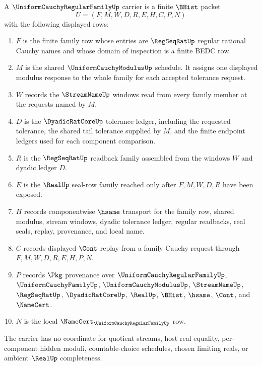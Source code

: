 \begin{definition}
\label{def:uniform-cauchy-regular-family-carrier}
A $\UniformCauchyRegularFamilyUp$ carrier is a finite $\BHist$ packet
$$
U=(F,M,W,D,R,E,H,C,P,N)
$$
with the following displayed rows:
\begin{enumerate}
\item $F$ is the finite family row whose entries are $\RegSeqRatUp$ regular rational Cauchy names and whose domain of inspection is a finite BEDC row.
\item $M$ is the shared $\UniformCauchyModulusUp$ schedule. It assigns one displayed modulus response to the whole family for each accepted tolerance request.
\item $W$ records the $\StreamNameUp$ windows read from every family member at the requests named by $M$.
\item $D$ is the $\DyadicRatCoreUp$ tolerance ledger, including the requested tolerance, the shared tail tolerance supplied by $M$, and the finite endpoint ledgers used for each component comparison.
\item $R$ is the $\RegSeqRatUp$ readback family assembled from the windows $W$ and dyadic ledger $D$.
\item $E$ is the $\RealUp$ seal-row family reached only after $F,M,W,D,R$ have been exposed.
\item $H$ records componentwise $\hsame$ transport for the family row, shared modulus, stream windows, dyadic tolerance ledger, regular readbacks, real seals, replay, provenance, and local name.
\item $C$ records displayed $\Cont$ replay from a family Cauchy request through $F,M,W,D,R,E,H,P,N$.
\item $P$ records $\Pkg$ provenance over $\UniformCauchyRegularFamilyUp$, $\UniformCauchyFamilyUp$, $\UniformCauchyModulusUp$, $\StreamNameUp$, $\RegSeqRatUp$, $\DyadicRatCoreUp$, $\RealUp$, $\BHist$, $\hsame$, $\Cont$, and $\NameCert$.
\item $N$ is the local $\NameCert_{\UniformCauchyRegularFamilyUp}$ row.
\end{enumerate}
The carrier has no coordinate for quotient streams, host real equality, per-component hidden moduli, countable-choice schedules, chosen limiting reals, or ambient $\RealUp$ completeness.
\end{definition}

